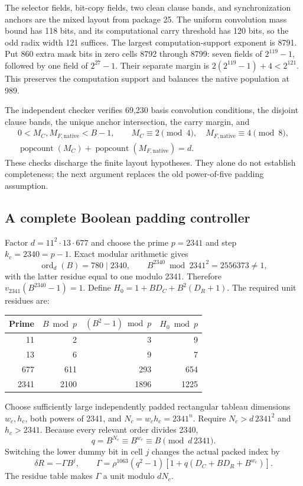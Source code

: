 \documentclass[11pt]{article}
\theoremstyle{definition}\newtheorem{definition}[theorem]{Definition}
\begin{document}
The selector fields, bit-copy fields, two clean clause bands, and synchronization anchors are the mixed layout from package 25. The uniform convolution mass bound has 118 bits, and its computational carry threshold has 120 bits, so the odd radix width 121 suffices. The largest computation-support exponent is 8791. Put 860 extra mask bits in zero cells 8792 through 8799: seven fields of $2^{119}-1$, followed by one field of $2^{27}-1$. Their separate margin is $2(2^{119}-1)+4<2^{121}$. This preserves the computation support and balances the native population at 989.

The independent checker verifies 69,230 basis convolution conditions, the disjoint clause bands, the unique anchor intersection, the carry margin, and
\begin{gather*}
 0<M_C,M_{F,\mathrm{native}}<B-1,\qquad
 M_C\equiv2\pmod4,\quad M_{F,\mathrm{native}}\equiv4\pmod8,\\
 \operatorname{popcount}(M_C)+\operatorname{popcount}(M_{F,\mathrm{native}})=d.
\end{gather*}
These checks discharge the finite layout hypotheses. They alone do not establish completeness; the next argument replaces the old power-of-five padding assumption.

\subsection{A complete Boolean padding controller}
Factor $d=11^2\cdot13\cdot677$ and choose the prime $p=2341$ and step $k_c=2340=p-1$. Exact modular arithmetic gives
\[
 \operatorname{ord}_d(B)=780\mid2340,\qquad
 B^{2340}\bmod2341^2=2556373\ne1,
\]
with the latter residue equal to one modulo 2341. Therefore
$v_{2341}(B^{2340}-1)=1$. Define $H_0=1+BD_C+B^2(D_R+1)$. The required unit residues are:
\begin{center}
\begin{tabular}{rrrr}
\toprule
Prime & $B\bmod p$ & $(B^2-1)\bmod p$ & $H_0\bmod p$\\
\midrule
11&2&3&9\\13&6&9&7\\677&611&293&654\\2341&2100&1896&1225\\
\bottomrule
\end{tabular}
\end{center}
Choose sufficiently large independently padded rectangular tableau dimensions $w_c,h_c$, both powers of 2341, and $N_c=w_ch_c=2341^n$. Require $N_c>d\,2341^2$ and $h_c>2341$. Because every relevant order divides 2340,
\[
 q=B^{N_c}\equiv B^{w_c}\equiv B\pmod{d\,2341}.
\]
Switching the lower dummy bit in cell $j$ changes the actual packed index by
\[
 \delta R=-\Gamma B^j,\qquad
 \Gamma=\rho^{1063}(q^2-1)
 [1+q(D_C+BD_R+B^{w_c})].
\]
The residue table makes $\Gamma$ a unit modulo $dN_c$.
\end{document}
